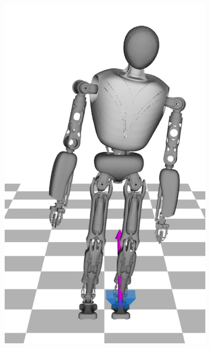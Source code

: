\begin{figure}
\begin{subfigure}{.16\textwidth}
	\includegraphics[width=1\linewidth]{fig/walkStatic/snaps/2}
	\caption{}
\end{subfigure}%
\begin{subfigure}{.16\textwidth}

\end{subfigure}
\end{figure}
